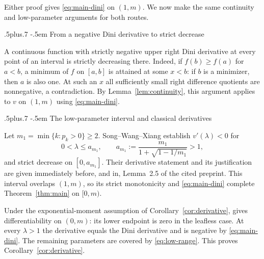 \documentclass[11pt,reqno]{amsart}
\makeatletter
\def\subsection{\@startsection{subsection}{2}{0pt}%
  {.5\linespacing plus.7\linespacing}
  {-.5em}
  {\normalfont\scshape}}
\theoremstyle{plain}
\theoremstyle{definition}
\theoremstyle{remark}
\numberwithin{equation}{section}
\makeatother
\begin{document}
Either proof gives \eqref{eq:main-dini} on $(1,m)$. We now make the
same continuity and low-parameter arguments for both routes.

\subsection{From a negative Dini derivative to strict decrease}

A continuous function with strictly negative upper right Dini derivative at
every point of an interval is strictly decreasing there. Indeed, if
$f(b)\ge f(a)$ for $a<b$, a minimum of $f$ on $[a,b]$ is attained at some
$x<b$: if $b$ is a minimizer, then $a$ is also one. At such an $x$ all
sufficiently small right difference quotients are nonnegative, a
contradiction. By Lemma~\ref{lem:continuity}, this argument applies to $v$ on
$(1,m)$ using \eqref{eq:main-dini}.

\subsection{The low-parameter interval and classical derivatives}

Let $m_1=\min\{k:p_k>0\}\ge2$. Song--Wang--Xiang
\cite[Theorem~1.2 and Lemma~2.5]{SWX} establish $v'(\lambda)<0$ for
\begin{equation}\label{eq:low-range}
 0<\lambda\le a_{m_1},\qquad
 a_{m_1}:=\frac{m_1}{1+\sqrt{1-1/m_1}}>1,
\end{equation}
and strict decrease on $[0,a_{m_1}]$. Their derivative statement and its
justification are given immediately before, and in, Lemma~2.5 of the cited
preprint. This interval overlaps $(1,m)$, so its strict monotonicity and
\eqref{eq:main-dini} complete Theorem~\ref{thm:main} on $[0,m)$.

Under the exponential-moment assumption of Corollary~\ref{cor:derivative},
\cite[Theorem~1.1]{BT} gives differentiability on $(0,m)$: its lower endpoint
is zero in the leafless case. At every $\lambda>1$ the derivative equals the
Dini derivative and is negative by \eqref{eq:main-dini}. The remaining
parameters are covered by \eqref{eq:low-range}. This proves
Corollary~\ref{cor:derivative}.
\end{document}
